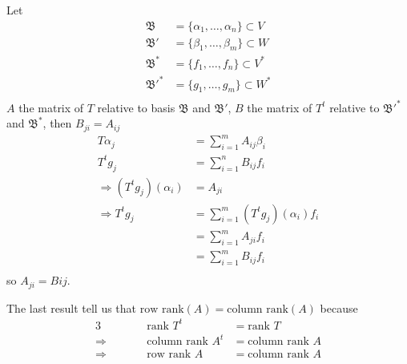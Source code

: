 \documentclass[../../../main.tex]{subfiles}
\begin{document}
Let 
\begin{align*}
    \mathfrak{B}&=\{\alpha_1,\dots,\alpha_n\}\subset V\\
    \mathfrak{B}'&=\{\beta_1,\dots,\beta_m\}\subset W\\
    \mathfrak{B}^*&=\{f_1,\dots,f_n\}\subset V^*\\
    \mathfrak{B}'^*&=\{g_1,\dots,g_m\}\subset W^*\\
\end{align*}
$A$ the matrix of $T$ relative to basis $\mathfrak{B}$ and $\mathfrak{B'}$, $B$ the matrix of $T^t$ relative to $\mathfrak{B'^*}$ and $\mathfrak{B^*}$, then $B_{ji}=A_{ij}$
\begin{align*}
    T\alpha_j &= \sum_{i=1}^m A_{ij}\beta_i\\
    T^t g_j &= \sum_{i=1}^n B_{ij}f_i\\
    \Longrightarrow (T^t g_j)(\alpha_i) &= A_{ji}\\
    \Longrightarrow T^t g_j &= \sum_{i=1}^m(T^t g_j)(\alpha_i) f_i\\
    &= \sum_{i=1}^m A_{ji} f_i\\
    &= \sum_{i=1}^m B_{ij} f_i\\
\end{align*}
so $A_{ji}=B{ij}$.

The last result tell us that $\text{row rank}(A) = \text{column rank}(A)$ because
\begin{alignat*}{3}
    &&\text{rank } T^t &= \text{rank } T\\
    \Longrightarrow \qquad&&\text{column rank } A^t &= \text{column rank } A\\
    \Longrightarrow \qquad&&\text{row rank } A &= \text{column rank } A\\
\end{alignat*}
\end{document}
